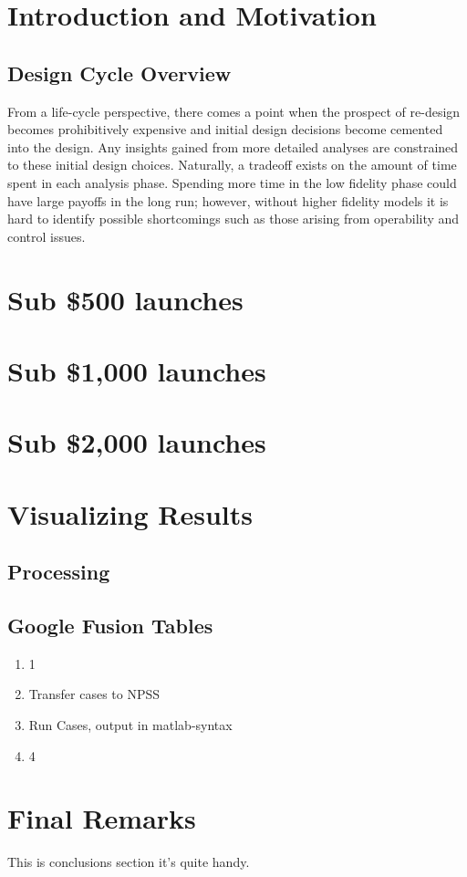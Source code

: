 \documentclass[heading.tex]{subfiles}
\begin{document}

\section{Introduction and Motivation}


\subsection{Design Cycle Overview}

	From a life-cycle perspective, there comes a point when the prospect of re-design becomes
prohibitively expensive and initial design decisions become cemented into the design. Any insights
gained from more detailed analyses are constrained to these initial design choices. Naturally, a
tradeoff exists on the amount of time spent in each analysis phase. Spending more time in the low
fidelity phase could have large payoffs in the long run; however, without higher fidelity models
it is hard to identify possible shortcomings such as those arising from operability and control
issues.

\section{Sub \$500 launches}

\section{Sub \$1,000 launches}

\section{Sub \$2,000 launches}

\section{Visualizing Results}


\subsection{Processing}

\subsection{Google Fusion Tables}


\begin{enumerate}
  \item 1
  \item Transfer cases to NPSS
  \item Run Cases, output in matlab-syntax
  \item 4
\end{enumerate}


\section{Final Remarks}
This is conclusions section it's quite handy.
\end{document}
